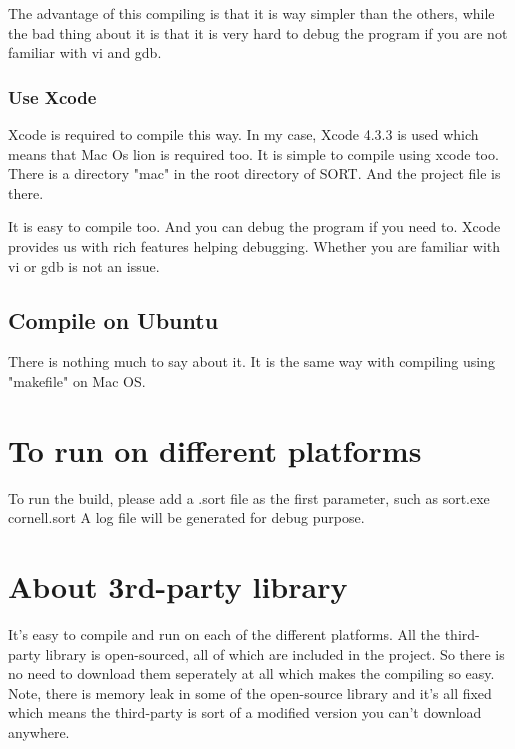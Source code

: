 \documentclass[10pt,a4paper]{article}
\begin{document}
The advantage of this compiling is that it is way simpler than the others,
while the bad thing about it is that it is very hard to debug the program if you are not familiar with vi and gdb.

\subsubsection{ Use Xcode }
Xcode is required to compile this way.
In my case, Xcode 4.3.3 is used which means that Mac Os lion is required too.
It is simple to compile using xcode too.
There is a directory "mac" in the root directory of SORT.
And the project file is there.

It is easy to compile too.
And you can debug the program if you need to.
Xcode provides us with rich features helping debugging.
Whether you are familiar with vi or gdb is not an issue.

\subsection{ Compile on Ubuntu }
There is nothing much to say about it.
It is the same way with compiling using "makefile" on Mac OS.

\section{ To run on different platforms }
To run the build, please add a .sort file as the first parameter, such as
sort.exe cornell.sort
A log file will be generated for debug purpose.

\section{ About 3rd-party library }
It's easy to compile and run on each of the different platforms.
All the third-party library is open-sourced, all of which are included in the project.
So there is no need to download them seperately at all which makes the compiling so easy.
Note, there is memory leak in some of the open-source library and it's all fixed which means the third-party is sort of a modified version you can't download anywhere.
\end{document}
